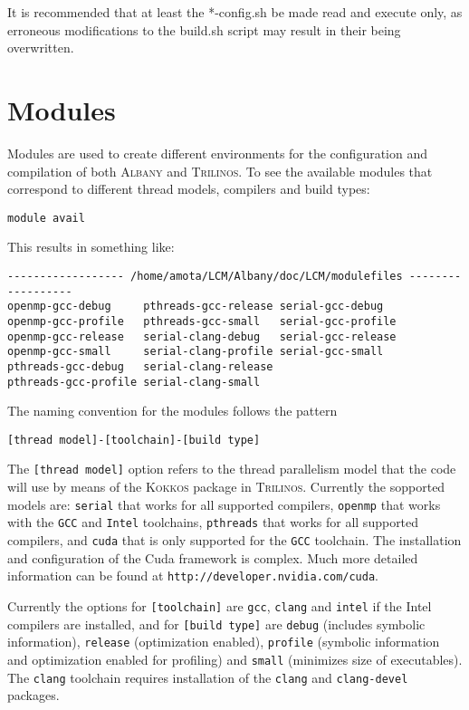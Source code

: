 \documentclass{article}
\newcommand{\trilinos}{\textsc{Trilinos}}
\newcommand{\albany}{\textsc{Albany}}
\newcommand{\kokkos}{\textsc{Kokkos}}
\begin{document}
It is recommended that at least the *-config.sh be made read and
execute only, as erroneous modifications to the build.sh script may
result in their being overwritten.

\section{Modules}
\label{sec:modules}

Modules are used to create different environments for the
configuration and compilation of both \albany{} and \trilinos{}. To
see the available modules that correspond to different thread models,
compilers and build types:
\begin{verbatim}
module avail
\end{verbatim}
This results in something like:
\begin{verbatim}
------------------ /home/amota/LCM/Albany/doc/LCM/modulefiles ------------------
openmp-gcc-debug     pthreads-gcc-release serial-gcc-debug
openmp-gcc-profile   pthreads-gcc-small   serial-gcc-profile
openmp-gcc-release   serial-clang-debug   serial-gcc-release
openmp-gcc-small     serial-clang-profile serial-gcc-small
pthreads-gcc-debug   serial-clang-release
pthreads-gcc-profile serial-clang-small
\end{verbatim}
The naming convention for the modules follows the pattern
\begin{verbatim}
[thread model]-[toolchain]-[build type]
\end{verbatim}
The \verb+[thread model]+ option refers to the thread parallelism
model that the code will use by means of the \kokkos{} package in
\trilinos{}. Currently the sopported models are: \verb+serial+ that
works for all supported compilers, \verb+openmp+ that works with the
\verb+GCC+ and \verb+Intel+ toolchains, \verb+pthreads+ that works for
all supported compilers, and \verb+cuda+ that is only supported for
the \verb+GCC+ toolchain. The installation and configuration of the
Cuda framework is complex. Much more detailed information can be found
at \verb+http://developer.nvidia.com/cuda+.

Currently the options for \verb+[toolchain]+ are \verb+gcc+,
\verb+clang+ and \verb+intel+ if the Intel compilers are installed,
and for \verb+[build type]+ are \verb+debug+ (includes symbolic
information), \verb+release+ (optimization enabled), \verb+profile+
(symbolic information and optimization enabled for profiling) and
\verb+small+ (minimizes size of executables). The \verb+clang+
toolchain requires installation of the \verb+clang+ and
\verb+clang-devel+ packages.
\end{document}
